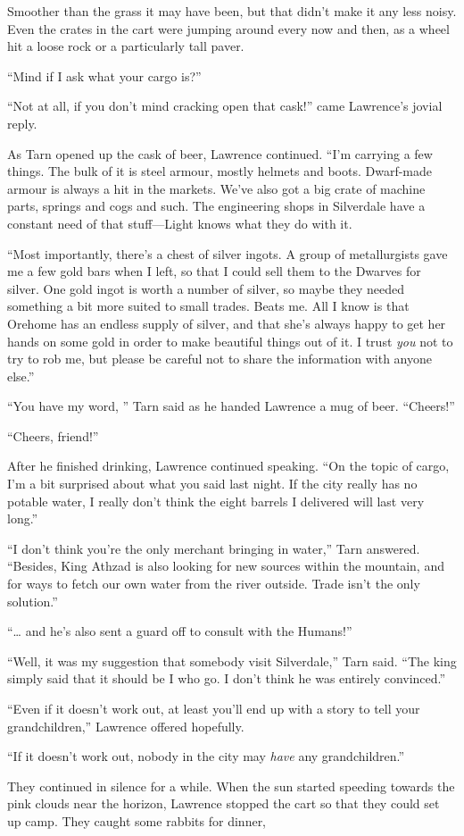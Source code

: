 Smoother than the grass it may have been, but that didn't make it any less noisy.  Even the crates in the cart were jumping around every now and then, as a wheel hit a loose rock or a particularly tall paver.

``Mind if I ask what your cargo is?''

``Not at all, if you don't mind cracking open that cask!'' came Lawrence's jovial reply.

As Tarn opened up the cask of beer, Lawrence continued.  ``I'm carrying a few things.  The bulk of it is steel armour, mostly helmets and boots.  Dwarf-made armour is always a hit in the markets.  We've also got a big crate of machine parts, springs and cogs and such.  The engineering shops in Silverdale have a constant need of that stuff---Light knows what they do with it.

``Most importantly, there's a chest of silver ingots.  A group of metallurgists gave me a few gold bars when I left, so that I could sell them to the Dwarves for silver.  One gold ingot is worth a number of silver, so maybe they needed something a bit more suited to small trades.  Beats me.  All I know is that Orehome has an endless supply of silver, and that she's always happy to get her hands on some gold in order to make beautiful things out of it.  I trust \emph{you} not to try to rob me, but please be careful not to share the information with anyone else.''

``You have my word, '' Tarn said as he handed Lawrence a mug of beer.  ``Cheers!''

``Cheers, friend!''

After he finished drinking, Lawrence continued speaking.  ``On the topic of cargo, I'm a bit surprised about what you said last night.  If the city really has no potable water, I really don't think the eight barrels I delivered will last very long.''

``I don't think you're the only merchant bringing in water,'' Tarn answered.  ``Besides, King Athzad is also looking for new sources within the mountain, and for ways to fetch our own water from the river outside.  Trade isn't the only solution.''

``\ldots{} and he's also sent a guard off to consult with the Humans!''

``Well, it was my suggestion that somebody visit Silverdale,'' Tarn said.  ``The king simply said that it should be I who go.  I don't think he was entirely convinced.''

``Even if it doesn't work out, at least you'll end up with a story to tell your grandchildren,'' Lawrence offered hopefully.

``If it doesn't work out, nobody in the city may \emph{have} any grandchildren.''

They continued in silence for a while.  When the sun started speeding towards the pink clouds near the horizon, Lawrence stopped the cart so that they could set up camp.  They caught some rabbits for dinner, 

